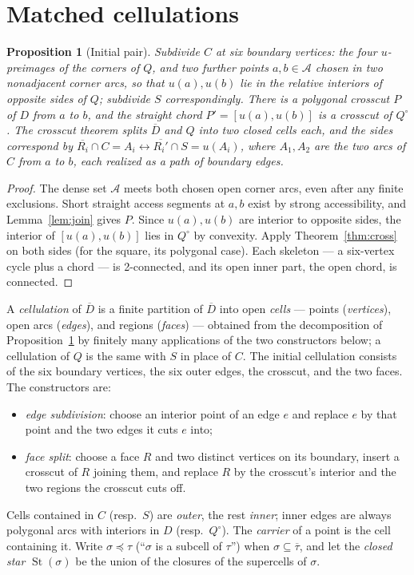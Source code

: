 \documentclass[11pt,a4paper]{article}
\theoremstyle{jsplain}
\newtheorem{proposition}[theorem]{Proposition}
\theoremstyle{jsdefn}
\newcommand{\St}{\operatorname{St}}
\begin{document}
\section{Matched cellulations}\label{sec:cell}

\begin{proposition}[Initial pair]\label{prop:init}
Subdivide $C$ at six boundary vertices: the four $u$-preimages of the
corners of $Q$, and two further points $a,b\in\mathcal A$ chosen in two
nonadjacent corner arcs, so that $u(a),u(b)$ lie in the relative
interiors of opposite sides of $Q$; subdivide $S$ correspondingly.
There is a polygonal crosscut $P$ of $D$ from $a$ to $b$, and the
straight chord $P'=[u(a),u(b)]$ is a crosscut of $Q^\circ$. The
crosscut theorem splits $\overline D$ and $Q$ into two closed cells
each, and the sides correspond by
$\overline{R_i}\cap C=A_i\leftrightarrow
\overline{R_i'}\cap S=u(A_i)$, where $A_1,A_2$ are the two arcs of
$C$ from $a$ to $b$, each realized as a path of boundary edges.
\end{proposition}
\begin{proof}
The dense set $\mathcal A$ meets both chosen open corner arcs, even after any
finite exclusions. Short straight access segments at $a,b$ exist by
strong accessibility, and Lemma~\ref{lem:join} gives $P$. Since
$u(a),u(b)$ are interior to opposite sides, the interior of
$[u(a),u(b)]$ lies in $Q^\circ$ by convexity. Apply
Theorem~\ref{thm:cross} on both sides (for the square, its polygonal
case). Each skeleton --- a six-vertex cycle plus a chord --- is
2-connected, and its open inner part, the open chord, is
connected.
\end{proof}

A \emph{cellulation} of $\overline D$ is a finite partition of
$\overline D$ into open \emph{cells} --- points (\emph{vertices}), open
arcs (\emph{edges}), and regions (\emph{faces}) --- obtained from the
decomposition of Proposition~\ref{prop:init} by finitely many
applications of the two constructors below; a cellulation of $Q$ is the
same with $S$ in place of $C$. The initial cellulation consists of the
six boundary vertices, the six outer edges, the crosscut, and the two
faces. The constructors are:
\begin{itemize}
\item[(i)] \emph{edge subdivision}: choose an interior point of an edge
$e$ and replace $e$ by that point and the two edges it cuts $e$ into;
\item[(ii)] \emph{face split}: choose a face $R$ and two distinct
vertices on its boundary, insert a crosscut of $R$ joining them, and
replace $R$ by the crosscut's interior and the two regions the crosscut
cuts off.
\end{itemize}
Cells contained in $C$ (resp.\ $S$) are \emph{outer}, the rest
\emph{inner}; inner edges are always polygonal arcs with interiors in
$D$ (resp.\ $Q^\circ$). The \emph{carrier} of a point is the cell
containing it. Write $\sigma\preceq\tau$ (``$\sigma$ is a subcell of
$\tau$'') when $\sigma\subseteq\overline\tau$, and let the
\emph{closed star} $\St(\sigma)$ be the union of the closures of the
supercells of $\sigma$.
\end{document}
